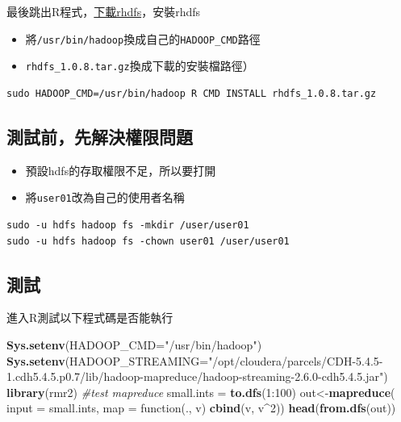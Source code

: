 \documentclass[]{book}
\newenvironment{Shaded}{\begin{snugshade}}{\end{snugshade}}
\newcommand{\KeywordTok}[1]{\textcolor[rgb]{0.13,0.29,0.53}{\textbf{{#1}}}}
\newcommand{\DataTypeTok}[1]{\textcolor[rgb]{0.13,0.29,0.53}{{#1}}}
\newcommand{\DecValTok}[1]{\textcolor[rgb]{0.00,0.00,0.81}{{#1}}}
\newcommand{\StringTok}[1]{\textcolor[rgb]{0.31,0.60,0.02}{{#1}}}
\newcommand{\CommentTok}[1]{\textcolor[rgb]{0.56,0.35,0.01}{\textit{{#1}}}}
\newcommand{\NormalTok}[1]{{#1}}
\providecommand{\tightlist}{%
  \setlength{\itemsep}{0pt}\setlength{\parskip}{0pt}}
\theoremstyle{definition}
\theoremstyle{definition}
\theoremstyle{remark}
\begin{document}
最後跳出R程式，\href{https://github.com/RevolutionAnalytics/RHadoop/wiki/Downloads}{下載rhdfs}，安裝rhdfs

\begin{itemize}
\tightlist
\item
  將\texttt{/usr/bin/hadoop}換成自己的\texttt{HADOOP\_CMD}路徑
\item
  \texttt{rhdfs\_1.0.8.tar.gz}換成下載的安裝檔路徑）
\end{itemize}

\begin{verbatim}
sudo HADOOP_CMD=/usr/bin/hadoop R CMD INSTALL rhdfs_1.0.8.tar.gz
\end{verbatim}

\subsection{測試前，先解決權限問題}

\begin{itemize}
\tightlist
\item
  預設hdfs的存取權限不足，所以要打開
\item
  將\texttt{user01}改為自己的使用者名稱
\end{itemize}

\begin{verbatim}
sudo -u hdfs hadoop fs -mkdir /user/user01
sudo -u hdfs hadoop fs -chown user01 /user/user01
\end{verbatim}

\subsection{測試}

進入R測試以下程式碼是否能執行

\begin{Shaded}
\begin{Highlighting}[]
\KeywordTok{Sys.setenv}\NormalTok{(}\DataTypeTok{HADOOP_CMD=}\StringTok{"/usr/bin/hadoop"}\NormalTok{)}
\KeywordTok{Sys.setenv}\NormalTok{(}\DataTypeTok{HADOOP_STREAMING=}\StringTok{"/opt/cloudera/parcels/CDH-5.4.5-1.cdh5.4.5.p0.7/lib/hadoop-mapreduce/hadoop-streaming-2.6.0-cdh5.4.5.jar"}\NormalTok{)}
\KeywordTok{library}\NormalTok{(rmr2)}
\CommentTok{#test mapreduce}
\NormalTok{small.ints =}\StringTok{ }\KeywordTok{to.dfs}\NormalTok{(}\DecValTok{1}\NormalTok{:}\DecValTok{100}\NormalTok{)}
\NormalTok{out<-}\KeywordTok{mapreduce}\NormalTok{(}
    \DataTypeTok{input =} \NormalTok{small.ints, }
    \DataTypeTok{map =} \NormalTok{function(., v) }\KeywordTok{cbind}\NormalTok{(v, v^}\DecValTok{2}\NormalTok{))}
\KeywordTok{head}\NormalTok{(}\KeywordTok{from.dfs}\NormalTok{(out))}
\end{Highlighting}
\end{Shaded}
\end{document}
